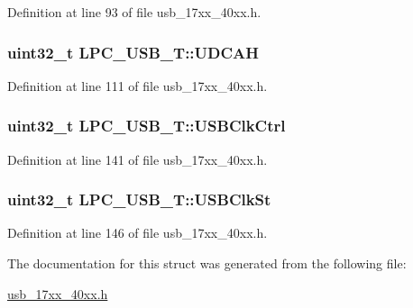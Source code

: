 Definition at line 93 of file usb\+\_\+17xx\+\_\+40xx.\+h.

\subsubsection[{\texorpdfstring{U\+D\+C\+AH}{UDCAH}}]{ uint32\+\_\+t L\+P\+C\+\_\+\+U\+S\+B\+\_\+\+T\+::\+U\+D\+C\+AH}\hypertarget{structLPC__USB__T_aaea2d08c4ce519077848b1dc11f04d4c}{}\label{structLPC__USB__T_aaea2d08c4ce519077848b1dc11f04d4c}


Definition at line 111 of file usb\+\_\+17xx\+\_\+40xx.\+h.

\subsubsection[{\texorpdfstring{U\+S\+B\+Clk\+Ctrl}{USBClkCtrl}}]{ uint32\+\_\+t L\+P\+C\+\_\+\+U\+S\+B\+\_\+\+T\+::\+U\+S\+B\+Clk\+Ctrl}\hypertarget{structLPC__USB__T_af45dceecc623dafb2281b7bf65b72c4d}{}\label{structLPC__USB__T_af45dceecc623dafb2281b7bf65b72c4d}


Definition at line 141 of file usb\+\_\+17xx\+\_\+40xx.\+h.

\subsubsection[{\texorpdfstring{U\+S\+B\+Clk\+St}{USBClkSt}}]{ uint32\+\_\+t L\+P\+C\+\_\+\+U\+S\+B\+\_\+\+T\+::\+U\+S\+B\+Clk\+St}\hypertarget{structLPC__USB__T_a1ee9ca18d52cf4182b2a7508eb318ece}{}\label{structLPC__USB__T_a1ee9ca18d52cf4182b2a7508eb318ece}


Definition at line 146 of file usb\+\_\+17xx\+\_\+40xx.\+h.



The documentation for this struct was generated from the following file\+:\begin{DoxyCompactItemize}
\item 
\hyperlink{usb__17xx__40xx_8h}{usb\+\_\+17xx\+\_\+40xx.\+h}\end{DoxyCompactItemize}
